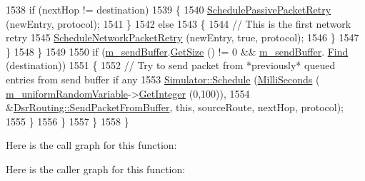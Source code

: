 \begin{DoxyCode}
1538                   \textcolor{keywordflow}{if} (nextHop != destination)
1539                     \{
1540                       \hyperlink{classns3_1_1dsr_1_1DsrRouting_abfdfa37822a492971fdf24540b635039}{SchedulePassivePacketRetry} (newEntry, protocol);
1541                     \}
1542                   \textcolor{keywordflow}{else}
1543                     \{
1544                       \textcolor{comment}{// This is the first network retry}
1545                       \hyperlink{classns3_1_1dsr_1_1DsrRouting_a6a18c6baa374d5e6a68f8952d1afdb13}{ScheduleNetworkPacketRetry} (newEntry, \textcolor{keyword}{true}, protocol);
1546                     \}
1547                 \}
1548             \}
1549 
1550           \textcolor{keywordflow}{if} (\hyperlink{classns3_1_1dsr_1_1DsrRouting_a887ae39d7060171753c0605d5c120549}{m\_sendBuffer}.\hyperlink{classns3_1_1dsr_1_1DsrSendBuffer_a0ecf75786eef7193fa5a5d84b2b7a1f0}{GetSize} () != 0 && \hyperlink{classns3_1_1dsr_1_1DsrRouting_a887ae39d7060171753c0605d5c120549}{m\_sendBuffer}.
      \hyperlink{classns3_1_1dsr_1_1DsrSendBuffer_acf27d9e92a1d1960b9094c4108724a53}{Find} (destination))
1551             \{
1552               \textcolor{comment}{// Try to send packet from *previously* queued entries from send buffer if any}
1553               \hyperlink{classns3_1_1Simulator_a671882c894a08af4a5e91181bf1eec13}{Simulator::Schedule} (\hyperlink{group__timecivil_gaf26127cf4571146b83a92ee18679c7a9}{MilliSeconds} (
      \hyperlink{classns3_1_1dsr_1_1DsrRouting_a22a85b3510166ffdd451e4010f996f0f}{m\_uniformRandomVariable}->\hyperlink{classns3_1_1RandomVariableStream_a66cd94e6305ce7f000f1a9ff0fcb9aef}{GetInteger} (0,100)),
1554                                    &\hyperlink{classns3_1_1dsr_1_1DsrRouting_a1a862a16f3a5527f9425763864ac3e80}{DsrRouting::SendPacketFromBuffer}, \textcolor{keyword}{this},
       sourceRoute, nextHop, protocol);
1555             \}
1556         \}
1557     \}
1558 \}
\end{DoxyCode}


Here is the call graph for this function\+:




Here is the caller graph for this function\+:



